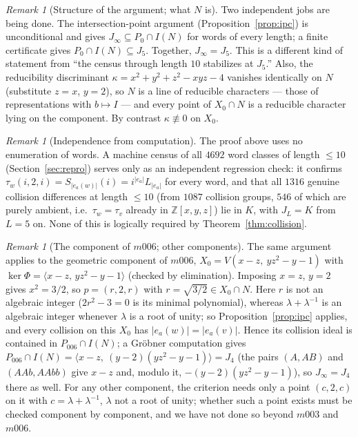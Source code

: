 \documentclass[11pt,a4paper]{article}
\theoremstyle{definition}
\theoremstyle{remark}
\newtheorem{remark}[theorem]{Remark}
\newcommand{\Z}{\mathbb{Z}}
\begin{document}
\begin{remark}[Structure of the argument; what $N$ is]
\label{rem:structure}
Two independent jobs are being done. The intersection-point argument
(Proposition~\ref{prop:ipc}) is unconditional and gives
$J_\infty\subseteq P_0\cap I(N)$ for words of every length; a finite
certificate gives $P_0\cap I(N)\subseteq J_5$. Together,
$J_\infty=J_5$. This is a different kind of statement from
``the census through length $10$ stabilizes at $J_5$.'' Also, the
reducibility discriminant $\kappa=x^2+y^2+z^2-xyz-4$ vanishes
identically on $N$ (substitute $z=x$, $y=2$), so $N$ is a line of
reducible characters --- those of representations with $b\mapsto I$ ---
and every point of $X_0\cap N$ is a reducible character lying on the
component. By contrast $\kappa\not\equiv0$ on $X_0$.
\end{remark}

\begin{remark}[Independence from computation]
The proof above uses no enumeration of words. A machine census of all
$4692$ word classes of length $\le10$ (Section~\ref{sec:repro}) serves
only as an independent regression check: it confirms
$\tau_w(i,2,i)=S_{|e_a(w)|}(i)=i^{|e_a|}L_{|e_a|}$ for every word, and
that all $1316$ genuine collision differences at length $\le10$ (from
$1087$ collision groups, $546$ of which are purely ambient, i.e.\
$\tau_w=\tau_v$ already in $\Z[x,y,z]$) lie in $K$, with $J_L=K$ from
$L=5$ on. None of this is logically required by
Theorem~\ref{thm:collision}.
\end{remark}

\begin{remark}[The component of $m006$; other components]
\label{rem:m006}
The same argument applies to the geometric component of $m006$,
$X_0=V(x-z,\ yz^2-y-1)$ with $\ker\Phi=\langle x-z,\,yz^2-y-1\rangle$
(checked by elimination). Imposing $x=z$, $y=2$ gives $x^2=3/2$, so
$p=(r,2,r)$ with $r=\sqrt{3/2}\in X_0\cap N$. Here $r$ is not an
algebraic integer ($2r^2-3=0$ is its minimal polynomial), whereas
$\lambda+\lambda^{-1}$ is an algebraic integer whenever $\lambda$ is a
root of unity; so Proposition~\ref{prop:ipc} applies, and every
collision on this $X_0$ has $|e_a(w)|=|e_a(v)|$. Hence its collision
ideal is contained in $P_{006}\cap I(N)$; a Gr\"obner computation gives
$P_{006}\cap I(N)=\langle x-z,\ (y-2)(yz^2-y-1)\rangle=J_4$ (the pairs
$(A,AB)$ and $(AAb,AAbb)$ give $x-z$ and, modulo it,
$-(y-2)(yz^2-y-1)$), so $J_\infty=J_4$ there as well. For any other
component, the criterion needs only a point $(c,2,c)$ on it with
$c=\lambda+\lambda^{-1}$, $\lambda$ not a root of unity; whether such a
point exists must be checked component by component, and we have not
done so beyond $m003$ and $m006$.
\end{remark}
\end{document}

